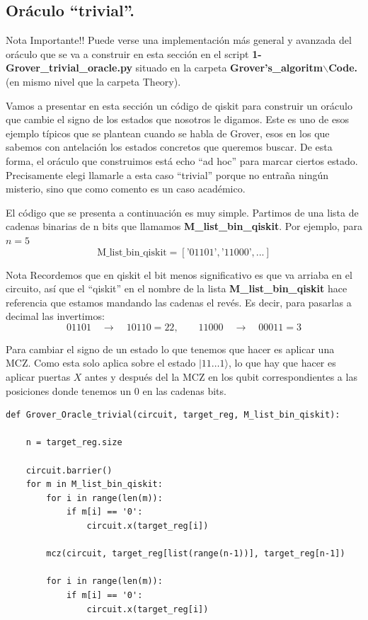 \documentclass[a4paper,11pt]{article} %
\numberwithin{equation}{section}
\begin{document}
\subsection{Oráculo ``trivial''.}

\begin{mybox_red}{Nota Importante!!}
Puede verse una implementación más general y avanzada del oráculo que se va a construir en esta sección en el script \textbf{1-Grover\_trivial\_oracle.py} situado en la carpeta \textbf{Grover's\_algoritm$\backslash$Code.} (en mismo nivel que la carpeta Theory).
\end{mybox_red}

Vamos a presentar en esta sección un código de qiskit para construir un oráculo que cambie el signo de los estados que nosotros le digamos. Este es uno de esos ejemplo típicos que se plantean cuando se habla de Grover, esos en los que sabemos con antelación los estados concretos que queremos buscar. De esta forma, el oráculo que construimos está echo ``ad hoc'' para marcar ciertos estado. Precisamente elegi llamarle a esta caso ``trivial'' porque no entraña ningún misterio, sino que como comento es un caso académico. 


El código que se presenta a continuación es muy simple. Partimos de una lista de cadenas binarias de n bits que llamamos \textbf{M\_list\_bin\_qiskit}. Por ejemplo, para $n=5$
$$
\text{M\_list\_bin\_qiskit} = [\text{'} 01101 \text{'}, \text{'} 11000 \text{'}, ...]
$$

	\begin{mybox}{Nota}
	Recordemos que en qiskit el bit menos significativo es que va arriaba en el circuito, así que 
	el ``qiskit'' en el nombre de la lista \textbf{M\_list\_bin\_qiskit} hace referencia que estamos 
	mandando las cadenas el revés. Es decir, para pasarlas a decimal las invertimos:
	$$
	01101 \quad \rightarrow \quad 10110 = 22, \qquad
	11000 \quad \rightarrow \quad 00011 = 3
	$$
	\end{mybox}


Para cambiar el signo de un estado lo que tenemos que hacer es aplicar una MCZ. Como esta solo aplica sobre el estado $|11\dots 1 \rangle$, lo que hay que hacer es aplicar puertas $X$ antes y después del la MCZ en los qubit correspondientes a las posiciones donde tenemos un 0 en las cadenas bits.

\begin{lstlisting}
def Grover_Oracle_trivial(circuit, target_reg, M_list_bin_qiskit): 

	n = target_reg.size

	circuit.barrier()
	for m in M_list_bin_qiskit:
		for i in range(len(m)):
			if m[i] == '0':
				circuit.x(target_reg[i])

		mcz(circuit, target_reg[list(range(n-1))], target_reg[n-1])
	    
		for i in range(len(m)):
			if m[i] == '0':
				circuit.x(target_reg[i])

\end{lstlisting}
\end{document}
